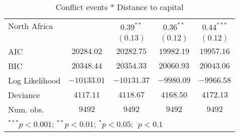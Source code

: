 \begin{sidewaystable}
\begin{center}
{\begin{tabular}{l c c c c}
North Africa                             &               & $0.39^{**}$   & $0.36^{**}$   & $0.44^{***}$  \\
                                         &               & $(0.13)$      & $(0.12)$      & $(0.12)$      \\
\midrule
AIC                                      & $20284.02$    & $20282.75$    & $19982.19$    & $19957.16$    \\
BIC                                      & $20348.44$    & $20354.33$    & $20060.93$    & $20043.06$    \\
Log Likelihood                           & $-10133.01$   & $-10131.37$   & $-9980.09$    & $-9966.58$    \\
Deviance                                 & $4117.11$     & $4118.67$     & $4168.50$     & $4172.13$     \\
Num. obs.                                & $9492$        & $9492$        & $9492$        & $9492$        \\
\bottomrule
\multicolumn{5}{l}{\scriptsize{$^{***}p<0.001$; $^{**}p<0.01$; $^{*}p<0.05$; $^{\cdot}p<0.1$}}
\end{tabular}
}
\caption{Conflict events *
		  Distance to capital}
\label{interaction_state_based}
\end{center}
\end{sidewaystable}
